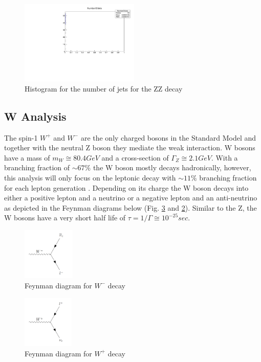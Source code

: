 \documentclass[runningheads,a4paper]{llncs}
\begin{document}
\begin{figure}
\centering
\includegraphics[height=4cm]{NumberOfJets_ZZ}
\caption{Histogram for the number of jets for the ZZ decay}
\label{fig:nojzz}
\end{figure}

\subsection{W Analysis}

The spin-1 ${W}^{+}$ and ${W}^{-}$ are the only charged bosons in the Standard Model and together with the neutral Z boson they mediate the weak interaction. W bosons have a mass of $m_{W}\cong 80.4 GeV$ and a cross-section of $\Gamma_{Z}\cong2.1 GeV$. With a branching fraction of $\sim67\%$ the W boson mostly decays hadronically, however, this analysis will only focus on the leptonic decay with $\sim11\%$ branching fraction for each lepton generation \cite{Agashe:2014kda}. Depending on its charge the W boson decays into either a positive lepton and a neutrino or a negative lepton and an anti-neutrino as depicted in the Feynman diagrams below (Fig. \ref{fig:feynmw+} and \ref{fig:feynmw-}). Similar to the Z, the W bosons have a very short half life of $\tau = 1/\Gamma\cong{ 10 }^{ -25 }sec$.

\begin{figure}
\centering
\includegraphics[height=2.5cm]{feynm_W-}
\caption{Feynman diagram for ${W}^{-}$ decay}
\label{fig:feynmw-}
\end{figure}

\begin{figure}
\centering
\includegraphics[height=2.5cm]{feynm_W+}
\caption{Feynman diagram for ${W}^{+}$ decay}
\label{fig:feynmw+}
\end{figure}
\end{document}

